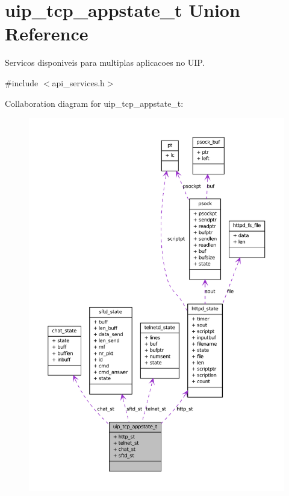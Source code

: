 \hypertarget{unionuip__tcp__appstate__t}{
\section{uip\_\-tcp\_\-appstate\_\-t Union Reference}
\label{unionuip__tcp__appstate__t}
}


Servicos disponiveis para multiplas aplicacoes no UIP.  




{\ttfamily \#include $<$api\_\-services.h$>$}



Collaboration diagram for uip\_\-tcp\_\-appstate\_\-t:
\nopagebreak
\begin{figure}[H]
\begin{center}
\leavevmode
\includegraphics[width=400pt]{unionuip__tcp__appstate__t__coll__graph}
\end{center}
\end{figure}
